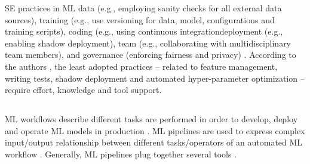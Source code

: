 \DIFdelbegin {}\DIFdelend %
\DIFaddbegin 

\DIFaddend SE practices in ML \DIFdelbegin {}\DIFdelend \DIFaddbegin {}\DIFaddend data (e.g., employing sanity checks for all external data sources), \DIFdelbegin {}\DIFdelend training (e.g., use versioning for data, model, configurations and training scripts), \DIFdelbegin {}\DIFdelend coding (e.g., using continuous integration\DIFdelbegin {}\DIFdelend \DIFaddbegin \DIFadd{, }\DIFaddend deployment (e.g., enabling shadow deployment), \DIFdelbegin {}\DIFdelend team (e.g., collaborating with multidisciplinary team members), and \DIFdelbegin {}\DIFdelend governance (enforcing fairness and privacy) \cite{Serban2020Practices}. According to the authors \cite{Serban2020Practices}, the least adopted practices --  related to feature management, writing tests, shadow deployment and automated hyper-parameter optimization -- require effort, knowledge and tool support. 
\DIFdelbegin {}\DIFdelend 

\DIFdelbegin \subsection{}
\addtocounter{subsection}{-1}%
\DIFdelend %

\DIFaddbegin \subsection{}

\DIFaddend ML workflows describe different tasks \DIFdelbegin {}\DIFdelend \DIFaddbegin {}\DIFaddend are performed in order to develop, deploy and operate ML models in production \cite{Amershi2019}. ML pipelines are used to express \DIFdelbegin {}\DIFdelend complex input/output relationship between 
\DIFdelbegin {}\DIFdelend different tasks/operators of an automated ML workflow \cite{Doris2021MLPipelines}. Generally, ML pipelines plug together several tools \DIFdelbegin {}\DIFdelend \DIFaddbegin {}\DIFaddend \cite{Hummer2019IBM}.

